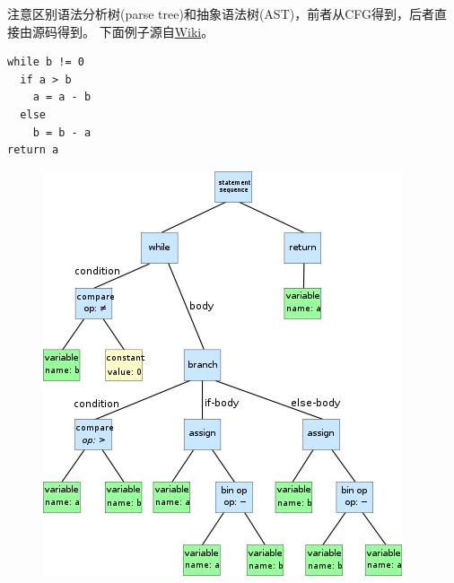 注意区别语法分析树(parse tree)和抽象语法树(AST)，前者从CFG得到，后者直接由源码得到。
下面例子源自\href{https://en.wikipedia.org/wiki/Abstract_syntax_tree}{Wiki}。
\begin{lstlisting}
while b != 0
  if a > b
    a = a - b
  else
    b = b - a
return a
\end{lstlisting}
\begin{figure}[H]
\centering
\includegraphics[width=0.5\linewidth]{fig/AST.png}
\end{figure}